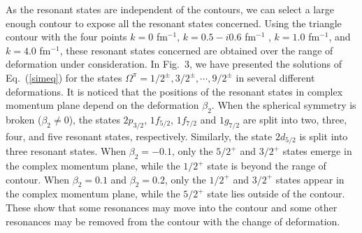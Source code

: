 \documentclass[twocolumn,prc,showpacs,preprintnumbers,superscriptaddress,floatfix]{revtex4}
\begin{document}
As the resonant states are independent of the contours, we can select a
large enough contour to expose all the resonant states concerned. Using the
triangle contour with the four points $k=0$ fm$^{-1}$, $k=0.5-i0.6$ fm$^{-1}$%
, $k=1.0$ fm$^{-1}$, and $k=4.0$ fm$^{-1}$, these resonant states concerned
are obtained over the range of deformation under consideration. In Fig.~3,
we have presented the solutions of Eq.~(\ref{simeq}) for the states $\Omega
^{\pi }=1/2^{\pm },3/2^{\pm },\cdots ,9/2^{\pm }$ in several different
deformations. It is noticed that the positions of the resonant states in
complex momentum plane depend on the deformation $\beta _{2}$. When the
spherical symmetry is broken ($\beta _{2}\neq 0$), the states $2p_{3/2}$, $%
1f_{5/2}$, $1f_{7/2}$ and $1g_{7/2}$ are split into two, three, four, and
five resonant states, respectively. Similarly, the state $2d_{5/2}$ is split
into three resonant states. When $\beta _{2}=-0.1$, only the $5/2^{+}$ and $%
3/2^{+}$ states emerge in the complex momentum plane, while the $1/2^{+}$
state is beyond the range of contour. When $\beta _{2}=0.1$ and $\beta
_{2}=0.2$, only the $1/2^{+}$ and $3/2^{+}$ states appear in the complex
momentum plane, while the $5/2^{+}$ state lies outside of the contour. These
show that some resonances may move into the contour and some other
resonances may be removed from the contour with the change of deformation.
\end{document}
